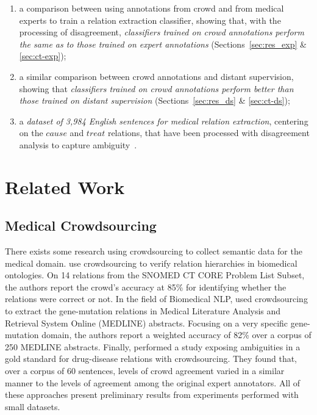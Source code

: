 \begin{enumerate}

\item a comparison between using annotations from crowd and from medical experts to train a relation extraction classifier, showing that, with the processing of disagreement, \textit{classifiers trained on crowd annotations perform the same as to those trained on expert annotations} (Sections~\ref{sec:res_exp} \& \ref{sec:ct-exp});

\item a similar comparison between crowd annotations and distant supervision, showing that \textit{classifiers trained on crowd annotations perform better than those trained on distant supervision} (Sections~\ref{sec:res_ds} \& \ref{sec:ct-ds});

\item a \textit{dataset of 3,984 English sentences for medical relation extraction}, centering on the $cause$ and $treat$ relations, that have been processed with disagreement analysis to capture ambiguity~\cite{anca_dumitrache_2016_50676}.

\end{enumerate}


\section{Related Work}

\subsection{Medical Crowdsourcing}

There exists some research using crowdsourcing to collect semantic data for the medical domain. \citet{mortensen2013crowdsourcing} use crowdsourcing to verify relation hierarchies in biomedical ontologies. On 14 relations from the SNOMED CT CORE Problem List Subset, the authors report the crowd's accuracy at 85\% for identifying whether the relations were correct or not. In the field of Biomedical NLP, \citet{burger2012validating} used crowdsourcing to extract the gene-mutation relations in Medical Literature Analysis and Retrieval System Online (MEDLINE) abstracts. Focusing on a very specific gene-mutation domain, the authors report a weighted accuracy of 82\% over a corpus of 250 MEDLINE abstracts. Finally, \citet{li2015exposing} performed a study exposing ambiguities in a gold standard for drug-disease relations with crowdsourcing. They found that, over a corpus of 60 sentences, levels  of  crowd agreement varied in a similar manner to the levels of agreement  among  the  original  expert  annotators. All of these approaches present preliminary results from experiments performed with small datasets.


